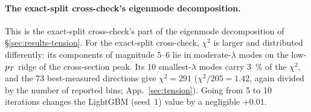 \paragraph{The exact-split cross-check's eigenmode decomposition.}
\label{app:devhistory-results}
This is the exact-split cross-check's part of the eigenmode decomposition of \S\ref{sec:results-tension}. For the exact-split cross-check, $\chi^{2}$ is larger and distributed differently: its components of magnitude $5$--$6$ lie in moderate-$\lambda$ modes on the low-$p_{T}$ ridge of the cross-section peak. Its 10 smallest-$\lambda$ modes carry \SI{3}{\percent} of the $\chi^{2}$, and the 73 best-measured directions give $\chi^{2}=291$ ($\chi^{2}/205=1.42$, again divided by the number of reported bins; App.~\ref{sec:tension}). Going from 5 to 10 iterations changes the LightGBM (seed~1) value by a negligible $+0.01$.

